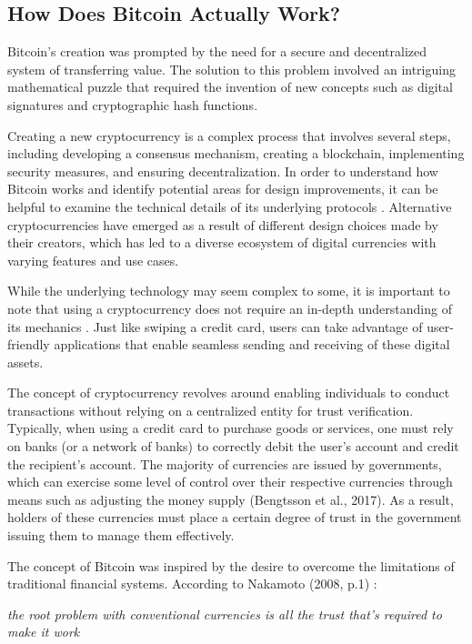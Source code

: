 \subsection{How Does Bitcoin Actually Work?}
Bitcoin's creation was prompted by the need for a secure and decentralized system of transferring value. The solution to this problem involved
an intriguing mathematical puzzle that required the invention of new concepts such as digital signatures and cryptographic hash functions.

Creating a new cryptocurrency is a complex process that involves several steps, including developing a consensus mechanism, creating a
blockchain, implementing security measures, and ensuring decentralization. In order to understand how Bitcoin works and identify potential
areas for design improvements, it can be helpful to examine the technical details of its underlying protocols \cite{nakamoto2008bitcoin}.
Alternative cryptocurrencies have emerged as a result of different design choices made by their creators, which has led to a diverse
ecosystem of digital currencies with varying features and use cases.

While the underlying technology may seem complex to some, it is important to note that using a cryptocurrency does not require an in-depth
understanding of its mechanics \cite{barski2014bitcoin}. Just like swiping a credit card, users can take advantage of user-friendly applications
that enable seamless sending and receiving of these digital assets.

The concept of cryptocurrency revolves around enabling individuals to conduct transactions without relying on a centralized entity for trust
verification. Typically, when using a credit card to purchase goods or services, one must rely on banks (or a network of banks) to correctly
debit the user's account and credit the recipient's account. The majority of currencies are issued by governments, which can exercise some
level of control over their respective currencies through means such as adjusting the money supply (Bengtsson et al., 2017). As a result,
holders of these currencies must place a certain degree of trust in the government issuing them to manage them effectively.

The concept of Bitcoin was inspired by the desire to overcome the limitations of traditional financial systems. According to Nakamoto
(2008, p.1) \cite{nakamoto2008bitcoin}:

\begin{displayquote}
    \textit{the root problem with conventional currencies is all the trust that's required to make it work}
\end{displayquote}


